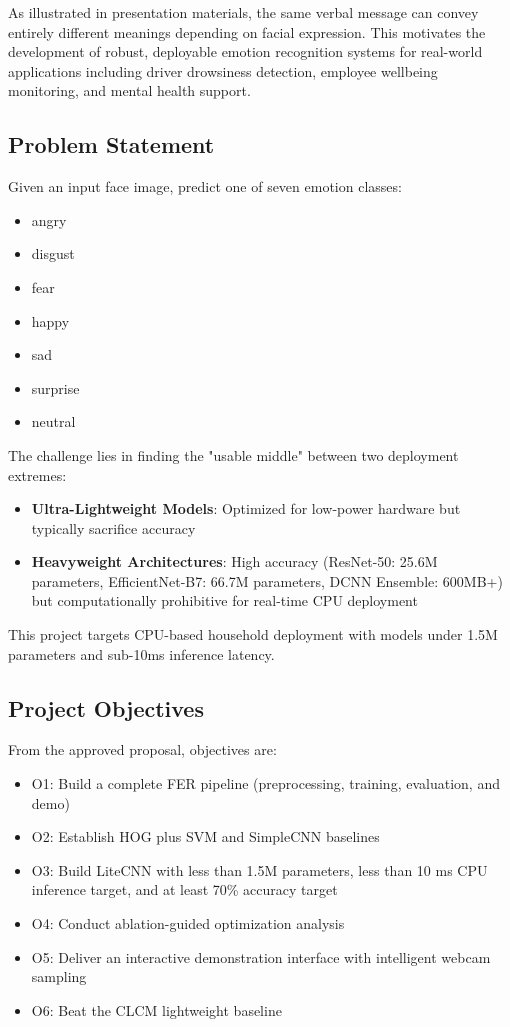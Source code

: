 \documentclass[12pt,a4paper]{article}
\begin{document}
As illustrated in presentation materials, the same verbal message can convey entirely different meanings depending on facial expression. This motivates the development of robust, deployable emotion recognition systems for real-world applications including driver drowsiness detection, employee wellbeing monitoring, and mental health support.

\subsection{Problem Statement}
Given an input face image, predict one of seven emotion classes:
\begin{itemize}[leftmargin=*]
    \item angry
    \item disgust
    \item fear
    \item happy
    \item sad
    \item surprise
    \item neutral
\end{itemize}

The challenge lies in finding the "usable middle" between two deployment extremes:

\begin{itemize}[leftmargin=*]
    \item \textbf{Ultra-Lightweight Models}: Optimized for low-power hardware but typically sacrifice accuracy
    \item \textbf{Heavyweight Architectures}: High accuracy (ResNet-50: 25.6M parameters, EfficientNet-B7: 66.7M parameters, DCNN Ensemble: 600MB+) but computationally prohibitive for real-time CPU deployment
\end{itemize}

This project targets CPU-based household deployment with models under 1.5M parameters and sub-10ms inference latency.

\subsection{Project Objectives}
From the approved proposal, objectives are:
\begin{itemize}[leftmargin=*]
    \item O1: Build a complete FER pipeline (preprocessing, training, evaluation, and demo)
    \item O2: Establish HOG plus SVM and SimpleCNN baselines
    \item O3: Build LiteCNN with less than 1.5M parameters, less than 10 ms CPU inference target, and at least 70\% accuracy target
    \item O4: Conduct ablation-guided optimization analysis
    \item O5: Deliver an interactive demonstration interface with intelligent webcam sampling
    \item O6: Beat the CLCM lightweight baseline
\end{itemize}
\end{document}
